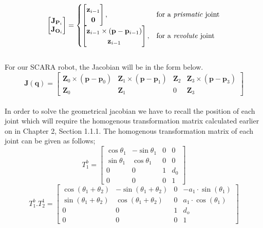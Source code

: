 \documentclass[12pt]{report}
\begin{document}
	\[
	\begin{bmatrix}
		\mathbf{J}_{\mathbf{P}_i} \\
		\mathbf{J}_{\mathbf{O}_i}
	\end{bmatrix}
	=
	\begin{cases} 
		\begin{bmatrix}
			\mathbf{z}_{i-1} \\
			\mathbf{0}
		\end{bmatrix}, & \text{for a \textit{prismatic} joint} \\
		\begin{bmatrix}
			\mathbf{z}_{i-1} \times (\mathbf{p} - \mathbf{p}_{i-1}) \\
			\mathbf{z}_{i-1}
		\end{bmatrix}, & \text{for a \textit{revolute} joint}
	\end{cases}
	\]\\
For our SCARA robot, the Jacobian will be in the form below.
\begin{equation}
	\mathbf{J}(\mathbf{q}) = \left[\begin{array}{cccc}
		\mathbf{Z}_0 \times\left(\mathbf{p} - \mathbf{p}_0\right) & \mathbf{Z}_1 \times\left(\mathbf{p} - \mathbf{p}_1\right) & \mathbf{Z}_2 & \mathbf{Z}_3 \times\left(\mathbf{p} - \mathbf{p}_3\right) \\
		\mathbf{Z}_0 & \mathbf{Z}_1 & 0 & \mathbf{Z}_3
	\end{array}\right]
\end{equation}\\
In order to solve the geometrical jacobian we have to recall the position of each joint which will require the homogenous transformation matrix calculated earlier on in Chapter 2, Section 1.1.1. The homogenous transformation matrix of each joint can be given as follows;\\
	\begin{equation}
		T_1^b=\left[\begin{array}{cccc}
			\cos \theta_1 & -\sin \theta_1 & 0 & 0 \\
			\sin \theta_1 & \cos \theta_1 & 0 & 0 \\
			0 & 0 & 1 & d_0 \\
			0 & 0 & 0 & 1
		\end{array}\right]
	\end{equation}
\begin{equation}
		T_1^b. T_2^1= 
	\begin{bmatrix}
		\cos(\theta_1 + \theta_2) & -\sin(\theta_1 + \theta_2) & 0 & -a_1 \cdot \sin(\theta_1) \\
		\sin(\theta_1 + \theta_2) & \cos(\theta_1 + \theta_2) & 0 & a_1 \cdot \cos(\theta_1) \\
		0 & 0 & 1 & d_o \\
		0 & 0 & 0 & 1
	\end{bmatrix}
\end{equation}
\end{document}
